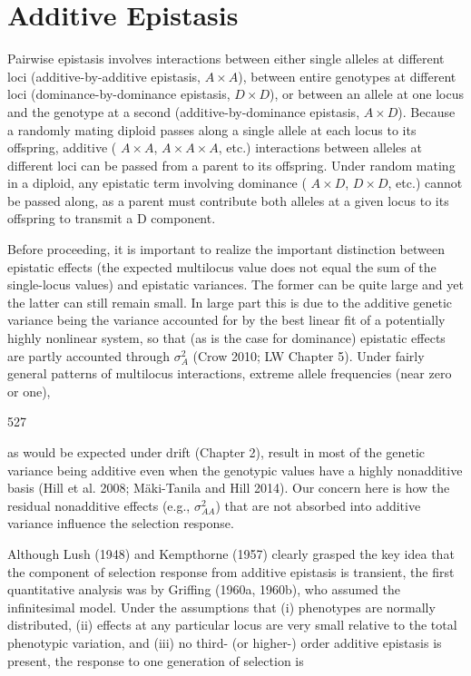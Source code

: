 \documentclass{article}
\begin{document}
\section{Additive Epistasis}
Pairwise epistasis involves interactions between either single alleles at different loci (additive-by-additive epistasis,  $ A \times A $), between entire genotypes at different loci (dominance-by-dominance epistasis,  $ D \times D $), or between an allele at one locus and the genotype at a second (additive-by-dominance epistasis,  $ A \times D $). Because a randomly mating diploid passes along a single allele at each locus to its offspring, additive ( $ A \times A $,  $ A \times A \times A $, etc.) interactions between alleles at different loci can be passed from a parent to its offspring. Under random mating in a diploid, any epistatic term involving dominance ( $ A \times D $,  $ D \times D $, etc.) cannot be passed along, as a parent must contribute both alleles at a given locus to its offspring to transmit a D component.

Before proceeding, it is important to realize the important distinction between epistatic effects (the expected multilocus value does not equal the sum of the single-locus values) and epistatic variances. The former can be quite large and yet the latter can still remain small. In large part this is due to the additive genetic variance being the variance accounted for by the best linear fit of a potentially highly nonlinear system, so that (as is the case for dominance) epistatic effects are partly accounted through  $ \sigma_A^2 $ (Crow 2010; LW Chapter 5). Under fairly general patterns of multilocus interactions, extreme allele frequencies (near zero or one),

527

as would be expected under drift (Chapter 2), result in most of the genetic variance being additive even when the genotypic values have a highly nonadditive basis (Hill et al. 2008; Mäki-Tanila and Hill 2014). Our concern here is how the residual nonadditive effects (e.g.,  $ \sigma_{AA}^{2} $) that are not absorbed into additive variance influence the selection response.

Although Lush (1948) and Kempthorne (1957) clearly grasped the key idea that the component of selection response from additive epistasis is transient, the first quantitative analysis was by Griffing (1960a, 1960b), who assumed the infinitesimal model. Under the assumptions that (i) phenotypes are normally distributed, (ii) effects at any particular locus are very small relative to the total phenotypic variation, and (iii) no third- (or higher-) order additive epistasis is present, the response to one generation of selection is
\end{document}
